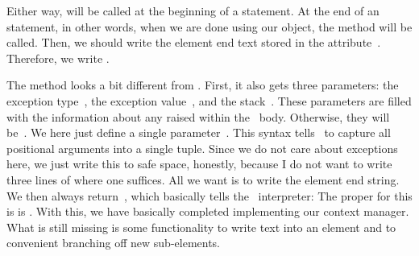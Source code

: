 %
%
%
Either way,  will be called at the beginning of a  statement.
At the end of an  statement, in other words, when we are done using our object, the  method will be called.
Then, we should write the element end text stored in the attribute~.
Therefore, we write .

The  method looks a bit different from .
First, it also gets three parameters: the exception type~, the exception value~, and the stack~.
These parameters are filled with the information about any  raised within the ~body.
Otherwise, they will be~.
We here just define a single parameter~.
This syntax tells \python\ to capture all positional arguments into a single tuple.
Since we do not care about exceptions here, we just write this to safe space, honestly, because I do not want to write three lines of  where one suffices.
All we want is to write the element end string.
We then always return~, which basically tells the \python~interpreter:
\emph{}
The proper  for this is  is .%
%
%
%
With this, we have basically completed implementing our context manager.
What is still missing is some functionality to write text into an element and to convenient branching off new sub-elements.

